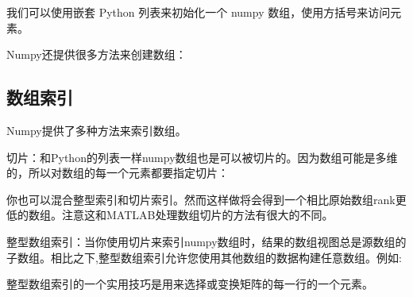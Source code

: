 \documentclass[10pt,a4paper]{article}
\begin{document}
我们可以使用嵌套 Python 列表来初始化一个 numpy 数组，使用方括号来访问元素。





Numpy还提供很多方法来创建数组：



\subsection{数组索引}

%

Numpy提供了多种方法来索引数组。

切片：和Python的列表一样numpy数组也是可以被切片的。因为数组可能是多维的，所以对数组的每一个元素都要指定切片：






你也可以混合整型索引和切片索引。然而这样做将会得到一个相比原始数组rank更低的数组。注意这和MATLAB处理数组切片的方法有很大的不同。






整型数组索引：当你使用切片来索引numpy数组时，结果的数组视图总是源数组的子数组。相比之下,整型数组索引允许您使用其他数组的数据构建任意数组。例如:





整型数组索引的一个实用技巧是用来选择或变换矩阵的每一行的一个元素。

\end{document}
